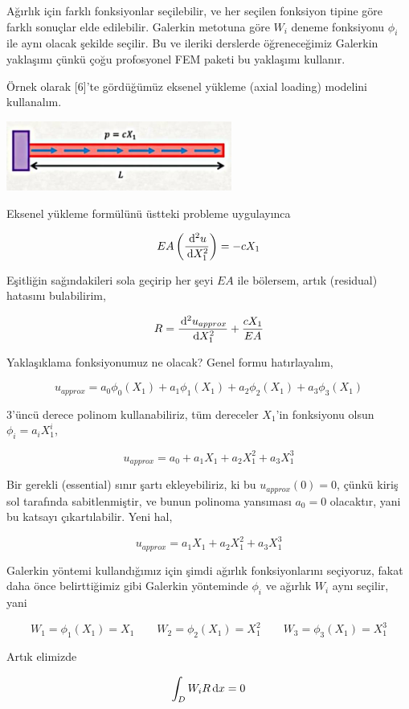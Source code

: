 \documentclass[12pt,fleqn]{article}\usepackage{../../common}
\begin{document}
Ağırlık için farklı fonksiyonlar seçilebilir, ve her seçilen fonksiyon tipine
göre farklı sonuçlar elde edilebilir. Galerkin metotuna göre $W_i$ deneme
fonksiyonu $\phi_i$ ile aynı olacak şekilde seçilir. Bu ve ileriki derslerde
öğreneceğimiz Galerkin yaklaşımı çünkü çoğu profosyonel FEM paketi bu yaklaşımı
kullanır.

Örnek olarak [6]'te gördüğümüz eksenel yükleme (axial loading) modelini
kullanalım. 

\includegraphics[width=20em]{compscieng_bpp45fem1_01.jpg}

Eksenel yükleme formülünü üstteki probleme uygulayınca

$$
EA \left( \frac{\,\mathrm{d}^2 u}{\,\mathrm{d} X_1^2}  \right) = -c X_1
$$

Eşitliğin sağındakileri sola geçirip her şeyi $EA$ ile bölersem, artık
(residual) hatasını bulabilirim,

$$
R = \frac{\,\mathrm{d}^2 u_{approx}}{\,\mathrm{d} X_1^2} + \frac{c X_1}{EA}
$$

Yaklaşıklama fonksiyonumuz ne olacak? Genel formu hatırlayalım,

$$
u_{approx} = a_0 \phi_0(X_1) + a_1 \phi_1(X_1) + a_2 \phi_2(X_1) + a_3 \phi_3(X_1) 
$$

3'üncü derece polinom kullanabiliriz, tüm dereceler $X_1$'in fonksiyonu olsun
$\phi_i = a_i X_1^i$, 

$$
u_{approx} = a_0 + a_1 X_1 + a_2 X_1^2 + a_3 X_1^3 
$$

Bir gerekli (essential) sınır şartı ekleyebiliriz, ki bu $u_{approx}(0)=0$,
çünkü kiriş sol tarafında sabitlenmiştir, ve bunun polinoma yansıması
$a_0=0$ olacaktır, yani bu katsayı çıkartılabilir. Yeni hal,

$$
u_{approx} = a_1 X_1 + a_2 X_1^2 + a_3 X_1^3 
$$

Galerkin yöntemi kullandığımız için şimdi ağırlık fonksiyonlarını seçiyoruz,
fakat daha önce belirttiğimiz gibi Galerkin yönteminde $\phi_i$ ve ağırlık $W_i$
aynı seçilir, yani

$$
W_1 = \phi_1(X_1) = X_1 \qquad 
W_2 = \phi_2(X_1) = X_1^2 \qquad 
W_3 = \phi_3(X_1) = X_1^3
$$

Artık elimizde 

$$
\int_D W_i R \,\mathrm{d} x = 0
$$
\end{document}
